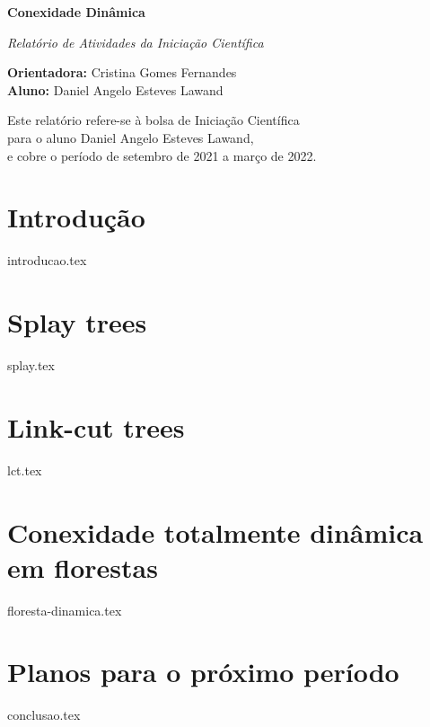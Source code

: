 \documentclass[12pt]{article}
\begin{document}
\begin{center}

{\Large {\bf Conexidade Dinâmica}} 

\vspace{0.2cm}
{\large {\em Relatório de Atividades da Iniciação Científica}
}

\vspace{0.2cm}
{\small 
{\bf Orientadora:} Cristina Gomes Fernandes \\
{\bf Aluno:} Daniel Angelo Esteves Lawand
}

\vspace*{\fill}
{\small Este relatório refere-se à bolsa de Iniciação Científica \\
para o aluno Daniel Angelo Esteves Lawand,\\ 
e cobre o período de setembro de 2021 a março de 2022.}

\end{center}
\vspace*{\fill}

\newpage

\section{Introdução}  
{introducao.tex}

\section{Splay trees}  
{splay.tex}

\section{Link-cut trees}  
{lct.tex}

\section{Conexidade totalmente dinâmica em florestas}  
{floresta-dinamica.tex}

\section{Planos para o próximo período}  
{conclusao.tex}



\end{document}
